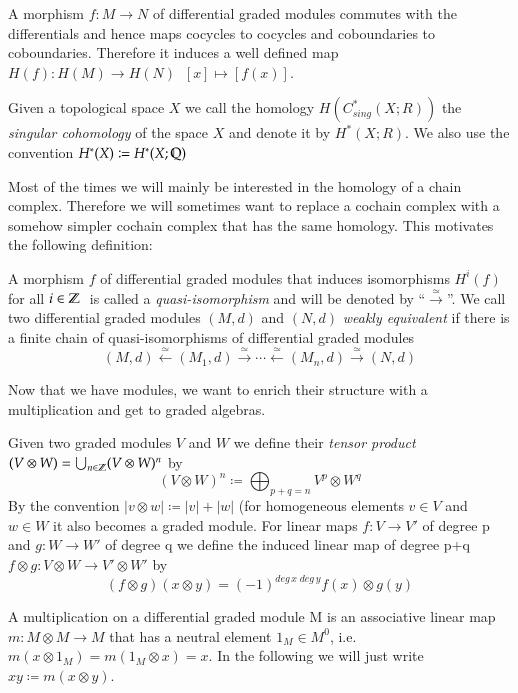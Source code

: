 A morphism $f \colon M \to N$ of differential graded modules commutes with the differentials and hence maps cocycles to cocycles
and coboundaries to coboundaries. Therefore it induces a well defined map $H(f) \colon H(M) \to H(N) \; \; [x] \mapsto [f(x)]$. 

\begin{Example}
 Given a topological space $X$ we call the homology $H(C^*_{sing}(X;R))$ the \emph{singular cohomology} of the space $X$
 and denote it by $H^*(X;R)$. We also use the convention $H^*(X) \coloneqq H^*(X; \mathbb{Q})$	
\end{Example}


Most of the times we will mainly be interested in the homology of a chain complex. Therefore we will sometimes want to replace
a cochain complex with a somehow simpler cochain complex that has the same homology. This motivates the following definition:

\begin{Definition}
 A morphism $f$ of differential graded modules that induces isomorphisms $H^i(f)$ for all $i \in \mathbb{Z} \;$ is called a
 \emph{quasi-isomorphism} and will be denoted by ``$\overset{\simeq}{\longrightarrow}$''. \newline
 We call two differential graded modules $(M,d)$ and $(N,d)$ \emph{weakly equivalent} if there is a finite chain of quasi-isomorphisms of differential
 graded modules
 $$ (M,d) \overset{\simeq}{\leftarrow} (M_1,d) \overset{\simeq}{\rightarrow} \cdots 
 \overset{\simeq}{\leftarrow} (M_n,d) \overset{\simeq}{\rightarrow} (N,d)$$
\end{Definition}


Now that we have modules, we want to enrich their structure with a multiplication and get to graded algebras.

\begin{Definition}
 Given two graded modules $V$ and $W$ we define their \emph{tensor product} \newline
 ${(V \otimes W) = \bigcup_{n \in \mathbb{Z}} (V \otimes W)^n }$ by 
 $$ (V \otimes W)^n \coloneqq \bigoplus_{p + q = n} V^p \otimes W^q$$
 By the convention $|v \otimes w| \coloneqq |v| + |w|$ (for homogeneous elements $v \in V$ and $w \in W$
 it also becomes a graded module. \newline
 For linear maps $f \colon V \to V'$ of degree p and $g \colon W \to W'$ of degree q we define the induced linear map
 of degree p+q \;  ${f \otimes g \colon V \otimes W \to V' \otimes W'}$ by
 $$ (f \otimes g) ( x \otimes y) = (-1)^{deg \, x \; deg \,y} f(x) \otimes g(y) $$

 A multiplication on a differential graded module M is an associative linear map \newline
 ${m \colon M \otimes M \to M }$ that has a neutral element $1_M \in M^0$, i.e. $m(x \otimes 1_M) = m(1_M \otimes x) = x$.
 In the following we will just write $xy \coloneqq m(x \otimes y)$.
 \end{Definition}


